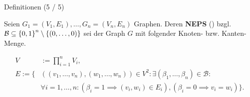 \documentclass[aspectratio=169]{beamer}
\begin{document}
\begin{frame}{Definitionen (5 / 5)}

    \begin{definition*}[NEPS]

        Seien $G_1 = (V_1, E_1), \dots, G_n = (V_n, E_n)$ Graphen. Deren \textbf{NEPS} () bzgl. $\mathcal B \subseteq {\left \{ 0, 1 \right \}}^n \setminus {\left \{ (0, \dots, 0) \right \}}$ sei der Graph $G$ mit folgender Knoten- bzw. Kanten-Menge.
    
        \begin{align*}
            V & := \prod_{i=1}^n V_i, \\
            E
            :=
            \{ &
                ((v_1, \dots, v_n), (w_1, \dots, w_n)) \in V^2:
                \exists (\beta_1, \dots, \beta_n) \in \mathcal B: \\ &
                    \forall i = 1, \dots, n:
                        (\beta_i = 1 \implies (v_i, w_i) \in E_i),
                        (\beta_i = 0 \implies v_i = w_i)
            \}.
        \end{align*}

    \end{definition*}
    

\end{frame}
\end{document}
